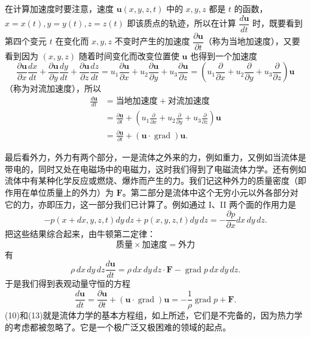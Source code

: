 在计算加速度时要注意，速度 $\boldsymbol u(x,y,z,t)$ 中的 $x,y,z$ 都是 $t$ 的函数，$x=x(t),y=y(t),z=z(t)$ 即该质点的轨迹，所以在计算 $\dfrac{d\boldsymbol u}{dt}$ 时，既要看到第四个变元 $t$ 在变化而 $x,y,z$ 不变时产生的加速度 $\dfrac{\partial\boldsymbol u}{\partial t}$（称为当地加速度），又要看到因为 $(x,y,z)$ 随着时间变化而改变位置使 $\boldsymbol u$ 也得到一个加速度
\[
\frac{\partial\boldsymbol u}{\partial x}\frac{dx}{dt}+\frac{\partial\boldsymbol u}{\partial y}\frac{dy}{dt}+\frac{\partial\boldsymbol u}{\partial z}\frac{dz}{dt}
=u_1\frac{\partial\boldsymbol u}{\partial x}+u_2\frac{\partial\boldsymbol u}{\partial y}+u_3\frac{\partial\boldsymbol u}{\partial z}
=\left(u_1\frac{\partial}{\partial x}+u_2\frac{\partial}{\partial y}+u_3\frac{\partial}{\partial z}\right)\boldsymbol u
\]
（称为对流加速度），所以
\begin{equation}
\begin{aligned}
\frac{d\boldsymbol u}{dt}
&=\text{当地加速度}+\text{对流加速度}\\
&=\frac{\partial\boldsymbol u}{\partial t}
 +\left(u_1\frac{\partial}{\partial x}+u_2\frac{\partial}{\partial y}+u_3\frac{\partial}{\partial z}\right)\boldsymbol u\\
&=\frac{\partial\boldsymbol u}{\partial t}+(\boldsymbol u\cdot\operatorname{grad})\boldsymbol u.
\end{aligned}
\tag{11}
\end{equation}

最后看外力，外力有两个部分，一是流体之外来的力，例如重力，又例如当流体是带电的，同时又处在电磁场中的电磁力，这时我们得到了电磁流体力学。还有例如流体中有某种化学反应或燃烧、爆炸而产生的力。我们记这种外力的质量密度（即作用在单位质量上的外力）为 $\boldsymbol F$。第二部分是流体中这个无穷小元以外各部分对它的力，亦即压力，这一部分我们已计算了。例如通过 I、II 两个面的作用力是
\begin{equation}
-p(x+dx,y,z,t)dy\,dz+p(x,y,z,t)dy\,dz=-\frac{\partial p}{\partial x}dx\,dy\,dz.
\tag{12}
\end{equation}
把这些结果综合起来，由牛顿第二定律：
\[
\text{质量}\times\text{加速度}=\text{外力}
\]
有
\[
\rho\,dx\,dy\,dz\frac{d\boldsymbol u}{dt}=\rho\,dx\,dy\,dz\cdot\boldsymbol F-\operatorname{grad}p\,dx\,dy\,dz.
\]
于是我们得到表观动量守恒的方程
\begin{equation}
\frac{d\boldsymbol u}{dt}=\frac{\partial\boldsymbol u}{\partial t}+(\boldsymbol u\cdot\operatorname{grad})\boldsymbol u=-\frac1\rho\operatorname{grad}p+\boldsymbol F.
\tag{13}
\end{equation}
(10)和(13)就是流体力学的基本方程组，如上所述，它们是不完备的，因为热力学的考虑都被忽略了。它是一个极广泛又极困难的领域的起点。

